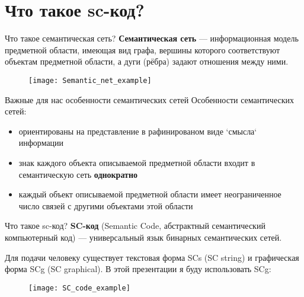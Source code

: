 % 
% 
%
% 
% 

\section{Что такое sc-код?}

\begin{frame}{Что такое семантическая сеть?}
  \textbf{Семантическая сеть} — информационная модель предметной
  области, имеющая вид графа, вершины которого соответствуют объектам
  предметной области, а дуги (рёбра) задают отношения между ними.
  \begin{figure}
    \centering
    \texttt{[image: Semantic\_net\_example]}
  \end{figure}
\end{frame}


\begin{frame}{Важные для нас особенности семантических сетей}
  Особенности семантических сетей:
  \begin{itemize}
  \item ориентированы на представление в рафинированом виде `смысла`
    информации
  \item знак каждого объекта описываемой предметной области входит в
    семантическую сеть \textbf{однократно}
  \item каждый объект описываемой предметной области имеет
    неограниченное число связей с другими объектами этой области
  \end{itemize}
\end{frame}


\begin{frame}{Что такое sc-код?}
  \textbf{SC-код} (Semantic Code, абстрактный семантический
  компьютерный код) — универсальный язык бинарных семантических сетей.
  
  Для подачи человеку существует текстовая форма SCs (SC string) и
  графическая форма SCg (SC graphical). В этой презентации я буду
  использовать SCg:
  \begin{figure}
    \centering
    \texttt{[image: SC\_code\_example]}
  \end{figure}
\end{frame}

